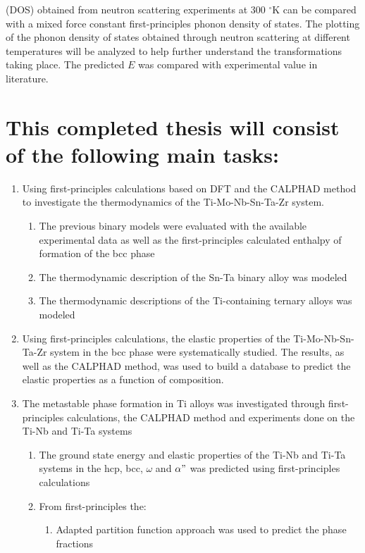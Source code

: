 (DOS) obtained from neutron scattering experiments at 300 $^\circ$K can be compared with a mixed force constant first-principles phonon density of states. The plotting of the phonon density of states obtained through neutron scattering at different temperatures will be analyzed to help further understand the transformations taking place. The predicted $E$ was compared with experimental value in literature.


\pagebreak
\section*{This completed thesis will consist of the following main tasks:}

\begin{enumerate}
	\item Using first-principles calculations based on DFT and the CALPHAD method to investigate the thermodynamics of the Ti-Mo-Nb-Sn-Ta-Zr system. 
	\begin{enumerate}
		\item The previous binary models were evaluated with the available experimental data as well as the first-principles calculated enthalpy of formation of the bcc phase
		\item The thermodynamic description of the Sn-Ta binary alloy was modeled
		\item The thermodynamic descriptions of the Ti-containing ternary alloys was modeled
	\end{enumerate}
	\item Using first-principles calculations, the elastic properties of the Ti-Mo-Nb-Sn-Ta-Zr system in the bcc phase were systematically studied. The results, as well as the CALPHAD method, was used to build a database to predict the elastic properties as a function of composition. 
	\item The metastable phase formation in Ti alloys was investigated through first-principles calculations, the CALPHAD method and experiments done on the Ti-Nb and Ti-Ta systems
	\begin{enumerate}
		\item The ground state energy and elastic properties of the Ti-Nb and Ti-Ta systems in the hcp, bcc, $\omega$ and $\alpha"$ was predicted using first-principles calculations
		\item From first-principles the:
			\begin{enumerate}
			\item Adapted partition function approach was used to predict the phase fractions

\end{enumerate}
\end{enumerate}
\end{enumerate}
